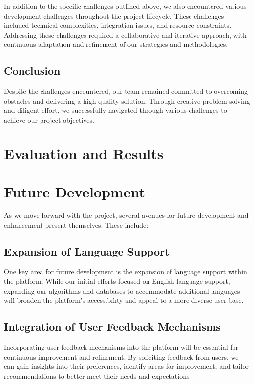 \documentclass{article}
\begin{document}
In addition to the specific challenges outlined above, we also encountered various development challenges throughout the project lifecycle. These challenges included technical complexities, integration issues, and resource constraints. Addressing these challenges required a collaborative and iterative approach, with continuous adaptation and refinement of our strategies and methodologies.

\subsection{Conclusion}

Despite the challenges encountered, our team remained committed to overcoming obstacles and delivering a high-quality solution. Through creative problem-solving and diligent effort, we successfully navigated through various challenges to achieve our project objectives.


\section{Evaluation and Results}

\section{Future Development}

As we move forward with the project, several avenues for future development and enhancement present themselves. These include:

\subsection{Expansion of Language Support}

One key area for future development is the expansion of language support within the platform. While our initial efforts focused on English language support, expanding our algorithms and databases to accommodate additional languages will broaden the platform's accessibility and appeal to a more diverse user base.

\subsection{Integration of User Feedback Mechanisms}

Incorporating user feedback mechanisms into the platform will be essential for continuous improvement and refinement. By soliciting feedback from users, we can gain insights into their preferences, identify areas for improvement, and tailor recommendations to better meet their needs and expectations.
\end{document}
